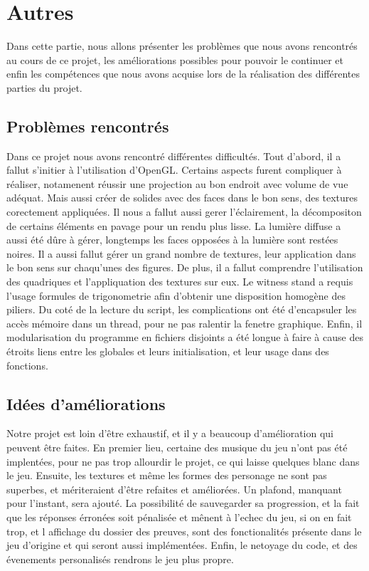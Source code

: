 \section{Autres}
	
	Dans cette partie, nous allons présenter les problèmes que nous avons rencontrés au cours de ce projet, les améliorations possibles pour pouvoir le continuer et enfin les compétences que nous avons acquise lors de la réalisation des différentes parties du projet.
	
\subsection{Problèmes rencontrés}
	Dans ce projet nous avons rencontré différentes difficultés. Tout d'abord, il a fallut s'initier à l'utilisation d'OpenGL. Certains aspects furent compliquer à réaliser, notamenent réussir une projection au bon endroit avec volume de vue adéquat. Mais aussi créer de solides avec des faces dans le bon sens, des textures corectement appliquées. Il nous a fallut aussi gerer l'éclairement, la décompositon de certains éléments en pavage pour un rendu plus lisse. La lumière diffuse a aussi été dûre à gérer, longtemps les faces opposées à la lumière sont restées noires. Il a aussi fallut gérer un grand nombre de textures, leur application dans le bon sens sur chaqu'unes des figures. De plus, il a fallut comprendre l'utilisation des quadriques et l'appliquation des textures sur eux. Le witness stand a requis l'usage formules de trigonometrie afin d'obtenir une disposition homogène des piliers.
	Du coté de la lecture du script, les complications ont été d'encapsuler les accès mémoire dans un thread, pour ne pas ralentir la fenetre graphique.
	 Enfin, il modularisation du programme en fichiers disjoints a été longue à faire à cause des étroits liens entre les globales et leurs initialisation, et leur usage dans des fonctions.
\subsection{Idées d'améliorations}
	Notre projet est loin d'être exhaustif, et il y a beaucoup d'amélioration qui peuvent être faites. En premier lieu, certaine des musique du jeu n'ont pas été implentées, pour ne pas trop allourdir le projet, ce qui laisse quelques blanc dans le jeu. Ensuite, les textures et même les formes des personage ne sont pas superbes, et mériteraient d'être refaites et améliorées. Un plafond, manquant pour l'instant, sera ajouté. La possibilité de sauvegarder sa progression, et la fait que les réponses érronées soit pénalisée et mênent à l'echec du jeu, si on en fait trop, et l affichage du dossier des preuves, sont des fonctionalités présente dans le jeu d'origine et qui seront aussi implémentées. Enfin, le netoyage du code, et des évenements personalisés rendrons le jeu plus propre.


